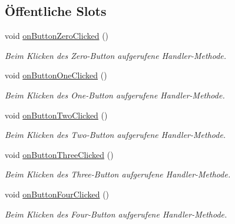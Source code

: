 \subsection*{Öffentliche Slots}
\begin{DoxyCompactItemize}
\item 
\hypertarget{class_num_pad_ac6620373f360b666b71108b13946013a}{}\label{class_num_pad_ac6620373f360b666b71108b13946013a} 
void \hyperlink{class_num_pad_ac6620373f360b666b71108b13946013a}{on\+Button\+Zero\+Clicked} ()
\begin{DoxyCompactList}\small\item\em Beim Klicken des Zero-\/\+Button aufgerufene Handler-\/\+Methode. \end{DoxyCompactList}\item 
\hypertarget{class_num_pad_a6623d11d0e41f47e476f5e99a0d4eb71}{}\label{class_num_pad_a6623d11d0e41f47e476f5e99a0d4eb71} 
void \hyperlink{class_num_pad_a6623d11d0e41f47e476f5e99a0d4eb71}{on\+Button\+One\+Clicked} ()
\begin{DoxyCompactList}\small\item\em Beim Klicken des One-\/\+Button aufgerufene Handler-\/\+Methode. \end{DoxyCompactList}\item 
\hypertarget{class_num_pad_a16eb90e6203c9d59eb0c6ea2697100c2}{}\label{class_num_pad_a16eb90e6203c9d59eb0c6ea2697100c2} 
void \hyperlink{class_num_pad_a16eb90e6203c9d59eb0c6ea2697100c2}{on\+Button\+Two\+Clicked} ()
\begin{DoxyCompactList}\small\item\em Beim Klicken des Two-\/\+Button aufgerufene Handler-\/\+Methode. \end{DoxyCompactList}\item 
\hypertarget{class_num_pad_a7e4ddab2ee993b84198b589b16305a76}{}\label{class_num_pad_a7e4ddab2ee993b84198b589b16305a76} 
void \hyperlink{class_num_pad_a7e4ddab2ee993b84198b589b16305a76}{on\+Button\+Three\+Clicked} ()
\begin{DoxyCompactList}\small\item\em Beim Klicken des Three-\/\+Button aufgerufene Handler-\/\+Methode. \end{DoxyCompactList}\item 
\hypertarget{class_num_pad_afd185aa4de995f81384ca9d6c0f52af5}{}\label{class_num_pad_afd185aa4de995f81384ca9d6c0f52af5} 
void \hyperlink{class_num_pad_afd185aa4de995f81384ca9d6c0f52af5}{on\+Button\+Four\+Clicked} ()
\begin{DoxyCompactList}\small\item\em Beim Klicken des Four-\/\+Button aufgerufene Handler-\/\+Methode. \end{DoxyCompactList}\item 

\end{DoxyCompactItemize}
